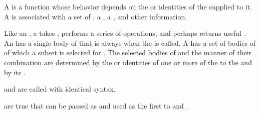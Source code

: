 


A  is a function whose behavior depends on
the  or identities of the  supplied to it.
A   
is associated with 
     a set of ,
     a ,
     a , 
 and other information.

Like an , a  takes ,
performs a series of operations, and perhaps returns useful .
An  has a single body of  that is always 
when the  is called.  A  has a set of bodies
of  of which a subset is selected for . The selected
bodies of  and the manner of their combination are determined by
the  or identities of one or more of the  to the
 and by its .

 and  are called with identical syntax.
 
 are true  that can be passed as 
and used as the first  to  and .

